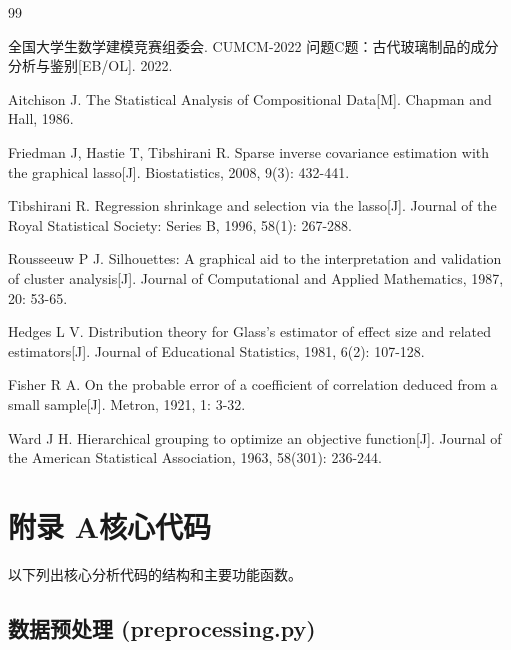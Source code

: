 \documentclass[fontset=windows, 12pt, a4paper]{ctexart}
\begin{document}
\newpage

\begin{thebibliography}{99}

 全国大学生数学建模竞赛组委会. CUMCM-2022 问题C题：古代玻璃制品的成分分析与鉴别[EB/OL]. 2022.

 Aitchison J. The Statistical Analysis of Compositional Data[M]. Chapman and Hall, 1986.

 Friedman J, Hastie T, Tibshirani R. Sparse inverse covariance estimation with the graphical lasso[J]. Biostatistics, 2008, 9(3): 432-441.

 Tibshirani R. Regression shrinkage and selection via the lasso[J]. Journal of the Royal Statistical Society: Series B, 1996, 58(1): 267-288.

 Rousseeuw P J. Silhouettes: A graphical aid to the interpretation and validation of cluster analysis[J]. Journal of Computational and Applied Mathematics, 1987, 20: 53-65.

 Hedges L V. Distribution theory for Glass's estimator of effect size and related estimators[J]. Journal of Educational Statistics, 1981, 6(2): 107-128.

 Fisher R A. On the probable error of a coefficient of correlation deduced from a small sample[J]. Metron, 1921, 1: 3-32.

 Ward J H. Hierarchical grouping to optimize an objective function[J]. Journal of the American Statistical Association, 1963, 58(301): 236-244.

\end{thebibliography}

\newpage

\section*{附录 A\quad 核心代码}

以下列出核心分析代码的结构和主要功能函数。

\subsection*{数据预处理 (preprocessing.py)}
\end{document}
